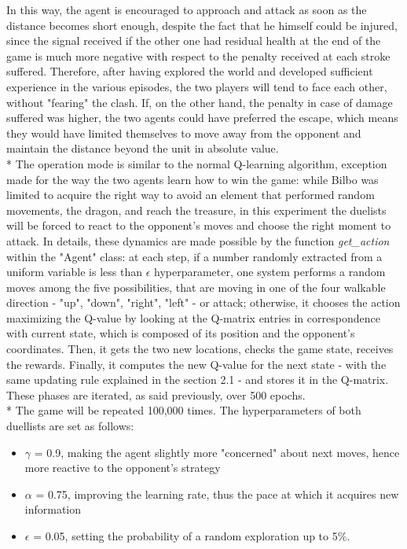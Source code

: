 In this way, the agent is encouraged to approach and attack as soon as the distance becomes short enough, despite the fact that he himself could be injured, since the signal received if the other one had residual health at the end of the game is much more negative with respect to the penalty received at each stroke suffered. Therefore, after having explored the world and developed sufficient experience in the various episodes, the two players will tend to face each other, without "fearing" the clash. If, on the other hand, the penalty in case of damage suffered was higher, the two agents could have preferred the escape, which means they would have limited themselves to move away from the opponent and maintain the distance beyond the unit in absolute value.\\*
The operation mode is similar to the normal Q-learning algorithm, exception made for the way the two agents learn how to win the game: while Bilbo was limited to acquire the right way to avoid an element that performed random movements, the dragon, and reach the treasure, in this experiment the duelists will be forced to react to the opponent's moves and choose the right moment to attack. In details, these dynamics are made possible by the function \textit{get\_action} within the "Agent" class:  at each step, if a number randomly extracted from a uniform variable is less than $\epsilon$ hyperparameter, one system performs a random moves among the five possibilities, that are moving in one of the four walkable direction - "up", "down", "right", "left" - or attack; otherwise, it chooses the action maximizing the Q-value by looking at the Q-matrix entries in correspondence with current state, which is composed of its position and the opponent's coordinates. Then, it gets the two new locations, checks the game state, receives the rewards. Finally, it computes the new Q-value for the next state - with the same updating rule explained in the section 2.1 - and stores it in the Q-matrix. These phases are iterated, as said previously, over 500 epochs.\\*
The game will be repeated 100,000 times. The hyperparameters of both duellists are set as follows:
\begin{itemize}
  \item $\gamma$ = 0.9, making the agent slightly more "concerned" about next moves, hence more reactive to the opponent's strategy
  \item $\alpha$ = 0.75, improving the learning rate, thus the pace at which it acquires new information
  \item $\epsilon$ = 0.05, setting the probability of a random exploration up to 5\%.
\end{itemize} 
